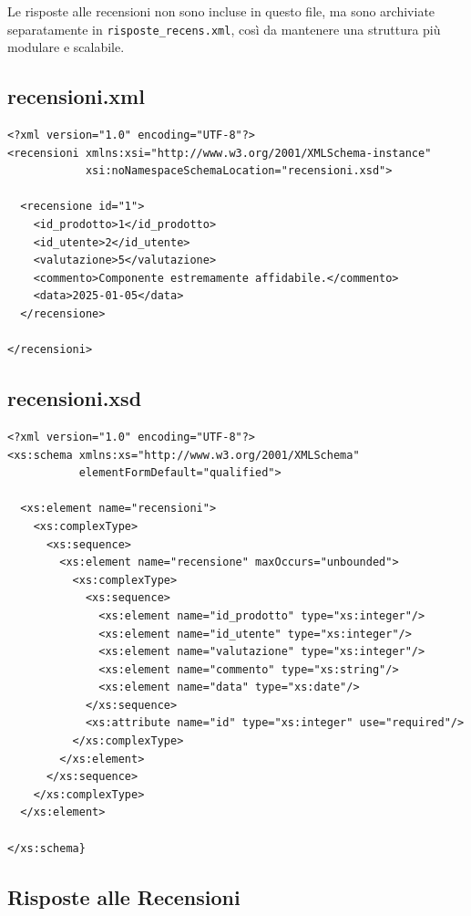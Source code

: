\documentclass[a4paper,12pt]{report}
\begin{document}
Le risposte alle recensioni non sono incluse in questo file,
ma sono archiviate separatamente in \texttt{risposte\_recens.xml},
così da mantenere una struttura più modulare e scalabile.

\subsection*{recensioni.xml}
{\footnotesize
\begin{lstlisting}
<?xml version="1.0" encoding="UTF-8"?>
<recensioni xmlns:xsi="http://www.w3.org/2001/XMLSchema-instance"
            xsi:noNamespaceSchemaLocation="recensioni.xsd">

  <recensione id="1">
    <id_prodotto>1</id_prodotto>
    <id_utente>2</id_utente>
    <valutazione>5</valutazione>
    <commento>Componente estremamente affidabile.</commento>
    <data>2025-01-05</data>
  </recensione>

</recensioni>
\end{lstlisting}}

\subsection*{recensioni.xsd}
{\footnotesize
\begin{lstlisting}
<?xml version="1.0" encoding="UTF-8"?>
<xs:schema xmlns:xs="http://www.w3.org/2001/XMLSchema"
           elementFormDefault="qualified">

  <xs:element name="recensioni">
    <xs:complexType>
      <xs:sequence>
        <xs:element name="recensione" maxOccurs="unbounded">
          <xs:complexType>
            <xs:sequence>
              <xs:element name="id_prodotto" type="xs:integer"/>
              <xs:element name="id_utente" type="xs:integer"/>
              <xs:element name="valutazione" type="xs:integer"/>
              <xs:element name="commento" type="xs:string"/>
              <xs:element name="data" type="xs:date"/>
            </xs:sequence>
            <xs:attribute name="id" type="xs:integer" use="required"/>
          </xs:complexType>
        </xs:element>
      </xs:sequence>
    </xs:complexType>
  </xs:element>

</xs:schema}
\end{lstlisting}}


\subsection*{Risposte alle Recensioni}
\label{sec:xml-risposte}
\end{document}
